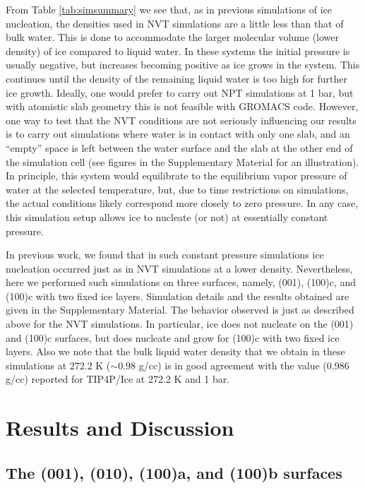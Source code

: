\documentclass[preprint,aps,prb,floatfix]{revtex4-1}
\begin{document}
From Table \ref{tab:simsummary} we see that, as in previous simulations of ice nucleation,\cite{ZBP15a,ZBP15b} the densities used in NVT simulations are a little less than that of bulk water. This is done to accommodate the larger molecular volume (lower density) of ice compared to liquid water. In these systems the initial pressure is usually negative, but increases becoming positive as ice grows in the system. This continues until the density of the remaining liquid water is too high for further ice growth. Ideally, one would prefer to carry out NPT simulations at 1 bar, but with atomistic slab geometry this is not feasible with GROMACS code. However, one way to test that the NVT conditions are not seriously influencing our results is to carry out simulations where water is in contact with only one slab, and an ``empty'' space is left between the water surface and the slab at the other end of the simulation cell (see figures in the Supplementary Material for an illustration). In principle, this system would equilibrate to the equilibrium vapor pressure of water at the selected temperature, but, due to time restrictions on simulations, the actual conditions likely correspond more closely to zero pressure. In any case, this simulation setup allows ice to nucleate (or not) at essentially constant pressure. 

In previous work,\cite{ZBP15b} we found that in such constant pressure simulations ice nucleation occurred just as in NVT simulations at a lower density. Nevertheless, here we performed such simulations on three surfaces, namely, (001), (100)c, and (100)c with two fixed ice layers. Simulation details and the results obtained are given in the Supplementary Material. The behavior observed is just as described above for the NVT simulations. In particular, ice does not nucleate on the (001) and (100)c surfaces, but does nucleate and grow for (100)c with two fixed ice layers. Also we note that the bulk liquid water density that we obtain in these simulations at 272.2 K ($\sim 0.98$ g/cc) is in good agreement with the value (0.986 g/cc) reported\cite{ASFV05} for TIP4P/Ice at 272.2 K and 1 bar. 


\section{Results and Discussion}
\label{results}

\subsection{The (001), (010), (100)a, and (100)b surfaces}
\label{expsurpar}
\end{document}
